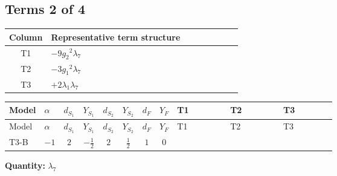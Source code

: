 \documentclass[8pt]{article}
\begin{document}
\begin{landscape}
\subsection*{Terms 2 of 4}
\begin{center}
\begin{tabular}{@{}c >{\raggedright\arraybackslash}p{0.82\linewidth}@{}}
\toprule
Column & Representative term structure \\
\midrule
T1 & \(\displaystyle -9 {g_2}^2 {\lambda_{7}}\) \\
\midrule
T2 & \(\displaystyle -3 {g_1}^2 {\lambda_{7}}\) \\
\midrule
T3 & \(\displaystyle +2 {\lambda_1} {\lambda_{7}}\) \\
\midrule
\bottomrule
\end{tabular}
\end{center}
\smallskip
\tiny
\begin{longtable}{@{}llcccccc >{\raggedright\arraybackslash}p{0.21\linewidth} >{\raggedright\arraybackslash}p{0.21\linewidth} >{\raggedright\arraybackslash}p{0.21\linewidth}@{}}
\toprule
Model & $\alpha$ & $d_{S_1}$ & $Y_{S_1}$ & $d_{S_2}$ & $Y_{S_2}$ & $d_F$ & $Y_F$ & T1 & T2 & T3 \\
\midrule
\endfirsthead
\toprule
Model & $\alpha$ & $d_{S_1}$ & $Y_{S_1}$ & $d_{S_2}$ & $Y_{S_2}$ & $d_F$ & $Y_F$ & T1 & T2 & T3 \\
\midrule
\endhead
T3-B & $-1$ & $2$ & $-\frac{1}{2}$ & $2$ & $\frac{1}{2}$ & $1$ & $0$ & \scriptsize\adjustbox{max width=\linewidth}{$\begin{gathered} -9 {g_2}^2 {\lambda_{7}}\end{gathered}$} & \scriptsize\adjustbox{max width=\linewidth}{$\begin{gathered} -3 {g_1}^2 {\lambda_{7}}\end{gathered}$} & \scriptsize\adjustbox{max width=\linewidth}{$\begin{gathered} +2 {\lambda_1} {\lambda_{7}}\end{gathered}$} \\
\midrule
\bottomrule
\end{longtable}
\clearpage
\noindent\textbf{Quantity: }$\lambda_{7}$\par\smallskip

\end{landscape}
\end{document}
